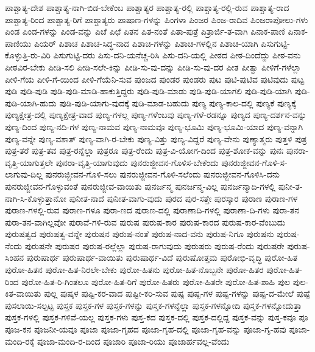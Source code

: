 {ಪಾಶ್ಚಾತ್ಯ-ದೇಶ
ಪಾಶ್ಚಾತ್ಯ-ನಾಗಿ-ಬಿಡ-ಬೇಕೆಂಬ
ಪಾಶ್ಚಾತ್ಯರ
ಪಾಶ್ಚಾತ್ಯ-ರಲ್ಲಿ
ಪಾಶ್ಚಾತ್ಯ-ರಲ್ಲಿ-ರುವ
ಪಾಶ್ಚಾತ್ಯ-ರಾದ
ಪಾಶ್ಚಾತ್ಯ-ರಿಂದ
ಪಾಶ್ಚಾತ್ಯ-ರಿಗೆ
ಪಾಶ್ಚಾತ್ಯರು
ಪಾಷಾಣ-ಗಳನ್ನು
ಪಿಂಗಳಾ
ಪಿಂಜರ
ಪಿಂಜ-ರಾದಿವ
ಪಿಂಜರಾಪೋಲು-ಗಳು
ಪಿಂಡ
ಪಿಂಡ-ಗಳನ್ನು
ಪಿಂಡ-ವನ್ನು
ಪಿಚೆ
ಪಿಛೆ
ಪಿತನ
ಪಿತ-ನಂತೆ
ಪಿತಾ-ಪುತ್ರೆ
ಪಿತ್ರಾರ್ಜಿ-ತ-ವಾಗಿ
ಪಿನಾಕ-ಪಾಣಿ
ಪಿನಾಕ-ಪಾಣಿಯು
ಪಿಯರ್
ಪಿಶಾಚ
ಪಿಶಾಚ-ಸಿದ್ಧ-ನಾದ
ಪಿಶಾಚಿ-ಗಳನ್ನು
ಪಿಶಾಚಿ-ಗಳಲ್ಲಿನ
ಪಿಶಾಚಿ-ಯಾಗಿ
ಪಿಸುಗುಟ್ಟಿ-ಕೊಳ್ಳುತ್ತಿ-ರು-ವಿರಿ
ಪಿಸುಗುಟ್ಟಿ-ದರು
ಪಿಸು-ದನಿ-ಯನೆಚ್ಚ-ರಿಸಿ
ಪಿಸು-ದನಿ-ಯಲ್ಲಿ
ಪೀಠದ
ಪೀಠ-ದಿಂದೆದ್ದು
ಪೀಠ-ವನು
ಪೀಠವಿರ-ಬೇಕು
ಪೀಡಿ-ಸಲಿ
ಪೀಡಿ-ಸಲೇ-ಕಿನ್ನು
ಪೀಡಿ-ಸು-ವು-ದನ್ನು
ಪೀಡಿ-ಸು-ವು-ದರ
ಪೀತ
ಪೀತ್ವಾ
ಪೀಳಿಗೆ-ಗಳೆಲ್ಲಾ
ಪೀಳಿ-ಗೆಯ
ಪೀಳಿ-ಗೆ-ಯಿಂದ
ಪೀಳಿ-ಗೆಯೆನಿ-ಸುವ
ಪುಂಜದ
ಪುಂಡರ
ಪುಂಡರು
ಪುಟ
ಪುಟಿ-ಪುಟಿವ
ಪುಟಿವುದು
ಪುಟ್ಟ
ಪುಡಿ
ಪುಡಿ-ಪುಡಿ
ಪುಡಿ-ಪುಡಿ-ಮಾಡಿ-ಹಾಕುತ್ತಿದ್ದರು
ಪುಡಿ-ಪುಡಿ-ಮಾಡು
ಪುಡಿ-ಪುಡಿ-ಯಾಗಲಿ
ಪುಡಿ-ಪುಡಿ-ಯಾಗಿ
ಪುಡಿ-ಪುಡಿ-ಯಾಗಿ-ಹುದು
ಪುಡಿ-ಪುಡಿ-ಯಾಗು-ವುದಕ್ಕೆ
ಪುಡಿ-ಮಾಡ-ಬಹುದು
ಪುಣ್ಯ
ಪುಣ್ಯ-ಕಾಲ-ದಲ್ಲಿ
ಪುಣ್ಯಕೆ
ಪುಣ್ಯಕ್ಕೆ
ಪುಣ್ಯಕ್ಷೇತ್ರ-ದಲ್ಲಿ
ಪುಣ್ಯಕ್ಷೇತ್ರ-ವಾದ
ಪುಣ್ಯ-ಗಳಲ್ಲ
ಪುಣ್ಯ-ಗಳೆಂಬವು
ಪುಣ್ಯ-ಗಳೆ-ರಡನ್ನೂ
ಪುಣ್ಯದ
ಪುಣ್ಯ-ದರ್ಶನ-ವನ್ನು
ಪುಣ್ಯ-ದಿಂದ
ಪುಣ್ಯ-ನದಿ-ಗಳ
ಪುಣ್ಯ-ನಾಮವ
ಪುಣ್ಯ-ನಾಮವೂ
ಪುಣ್ಯ-ಭೂಮಿ
ಪುಣ್ಯ-ಭೂಮಿ-ಯಾದ
ಪುಣ್ಯ-ವನ್ನಾಗಿ
ಪುಣ್ಯ-ವನ್ನೇ
ಪುಣ್ಯ-ವಶಾತ್
ಪುಣ್ಯ-ವಾಗಿ-ರ-ಬೇಕು
ಪುಣ್ಯ-ವಿತ್ತು
ಪುಣ್ಯ-ವಿದ್ದರೆ
ಪುಣ್ಯ-ವೇನು
ಪುಣ್ಯಾತ್ಮರು
ಪುತ್ತಳಿ
ಪುತ್ರ
ಪುತ್ರ-ತರೆ
ಪುತ್ರ-ತವ
ಪುತ್ರ-ರನ್ನೆಲ್ಲಾ
ಪುತ್ರರೂ
ಪುತ್ರ-ರೆಂದು
ಪುತ್ರ-ವಿ-ಯೋಗ-ದಿಂದ
ಪುತ್ರ-ಶೋಕ-ವನ್ನು
ಪುನಃ
ಪುನರಾ-ವೃತ್ತಿ-ಯಾಗುತ್ತಲೇ
ಪುನರಾ-ವೃತ್ತಿ-ಯಾಗುವುದು
ಪುನರುಜ್ಜೀವನ-ಗೊಳಿಸ-ಬೇಕೆಂದು
ಪುನರುಜ್ಜೀವನ-ಗೊಳಿ-ಸ-ಲಾಗುವು-ದಿಲ್ಲ
ಪುನರುಜ್ಜೀವನ-ಗೊಳಿ-ಸಲು
ಪುನರುಜ್ಜೀವನ-ಗೊಳಿ-ಸಲೆಂದು
ಪುನರುಜ್ಜೀವನ-ಗೊಳಿಸಿ-ದನು
ಪುನರುಜ್ಜೀವನ-ಗೊಳ್ಳುವಂತೆ
ಪುನರುಜ್ಜೀವ-ವಾಯಿತು
ಪುನರ್ಜನ್ಮ
ಪುನರ್ಜನ್ಮ-ವಿಲ್ಲ
ಪುನರ್ಜನ್ಮಾದಿ-ಗಳಲ್ಲಿ
ಪುನೀ-ತ-ನಾಗಿ-ಸಿ-ಕೊಳ್ಳುತ್ತಾನೋ
ಪುನೀತ-ನಾದೆ
ಪುನೀತ-ವಾಗು-ವುದು
ಪುರದ
ಪುರ-ಸತ್ತೇ
ಪುರಸ್ಕಾರ
ಪುರಾಣ
ಪುರಾಣ-ಗಳ
ಪುರಾಣ-ಗಳಲ್ಲಿ-ರುವ
ಪುರಾಣ-ಗಳೂ
ಪುರಾ-ಣದ
ಪುರಾಣ-ದಲ್ಲಿ
ಪುರಾಣಾದಿ-ಗಳಲ್ಲಿ
ಪುರಾಣಾ-ದಿ-ಗಳು
ಪುರಾ-ತನ
ಪುರಾ-ತನ-ವಾಗಿಲ್ಲವೋ
ಪುರಾವೆ-ಗಳಿ-ರುವ
ಪುರುಷ
ಪುರುಷ-ಕಾರ
ಪುರುಷ-ಕಾರದ
ಪುರುಷ-ಕಾರ-ವೆಂಬುದು
ಪುರುಷತ್ವದ
ಪುರುಷತ್ವ-ವನ್ನೇ
ಪುರುಷನ
ಪುರುಷ-ನಂತೆ
ಪುರುಷ-ನಾದ-ವನು
ಪುರುಷ-ನಿಗೂ
ಪುರುಷನು
ಪುರುಷ-ನೆಂದು
ಪುರುಷನೇ
ಪುರುಷರ
ಪುರುಷ-ರಲ್ಲೆಲ್ಲಾ
ಪುರುಷ-ರಾಗುವುದು
ಪುರುಷರು
ಪುರುಷ-ರೆಂದು
ಪುರುಷರೇ
ಪುರುಷ-ಸಿಂಹನ
ಪುರುಷಾರ್ಥ
ಪುರುಷಾರ್ಥ-ವಾಯಿತು
ಪುರುಷಾರ್ಥ-ವಿದೆ
ಪುರುಷೋತ್ತಮ
ಪುರೋಭಿ-ವೃದ್ಧಿ
ಪುರೋ-ಹಿತ
ಪುರೋ-ಹಿತನ
ಪುರೋ-ಹಿತ-ನಿರಲೇ-ಬೇಕು
ಪುರೋ-ಹಿತನು
ಪುರೋ-ಹಿತ-ನೊಬ್ಬನೇ
ಪುರೋ-ಹಿತರ
ಪುರೋ-ಹಿತ-ರಿಂದ
ಪುರೋ-ಹಿತ-ರಿ-ಗಿಂತಲೂ
ಪುರೋ-ಹಿತ-ರಿಗೆ
ಪುರೋ-ಹಿತರು
ಪುರೋ-ಹಿತರೇ
ಪುರೋ-ಹಿತ-ಶಾಹಿ
ಪುಲ
ಪುಲ-ಕಿತ-ವಾಯಿತು
ಪುಲ್ಲ
ಪುಷ್ಕಳ
ಪುಷ್ಟಿ-ಕರ-ವಾದ
ಪುಷ್ಟೀ-ಕರಿ-ಸುವ
ಪುಷ್ಪ
ಪುಷ್ಪ-ಗಳ
ಪುಷ್ಪ-ಗಳನ್ನು
ಪುಷ್ಪ-ದ-ಮೇಲೆ
ಪುಷ್ಪೆ
ಪುಸಲಾಯಿ-ಸಲ್ಪಟ್ಟ
ಪುಸ್ತಕ
ಪುಸ್ತಕ-ಗಳ
ಪುಸ್ತಕ-ಗಳನ್ನು
ಪುಸ್ತಕ-ಗಳನ್ನೆಲ್ಲಾ
ಪುಸ್ತಕ-ಗಳನ್ನೋದಿ
ಪುಸ್ತಕ-ಗಳನ್ನೋದುತ್ತಾ
ಪುಸ್ತಕ-ಗಳಲ್ಲಿ
ಪುಸ್ತಕ-ಗಳಿವೆ-ಯಲ್ಲ
ಪುಸ್ತಕ-ಗಳು
ಪುಸ್ತ-ಕದ
ಪುಸ್ತಕ-ದಲ್ಲಿ
ಪುಸ್ತಕ-ದಲ್ಲಿದ್ದ
ಪುಸ್ತಕ-ವನ್ನು
ಪುಸ್ತ-ಕವೂ
ಪೂ
ಪೂಜ-ಕನ
ಪೂಜನೀ-ಯವೂ
ಪೂಜಾ
ಪೂಜಾ-ಗೃಹದ
ಪೂಜಾ-ಗೃಹ-ದಲ್ಲಿ
ಪೂಜಾ-ಗೃಹ-ವನ್ನು
ಪೂಜಾ-ಗೃ-ಹವು
ಪೂಜಾ-ಮಂದಿ-ರಕ್ಕೆ
ಪೂಜಾ-ಮಂದಿ-ರ-ದಿಂದ
ಪೂಜಾರಿ
ಪೂಜಾ-ರಿಯು
ಪೂಜಾರ್ಹವಲ್ಲ-ವೆಂದು
}
